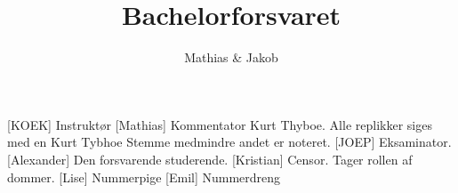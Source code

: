 \documentclass[a4paper,11pt]{article}
\title{Bachelorforsvaret}
\author{Mathias \& Jakob }
\begin{document}
\maketitle

\begin{roles}
[KOEK] Instruktør
[Mathias] Kommentator Kurt Thyboe. Alle replikker siges med en Kurt Tybhoe Stemme medmindre andet er noteret.
[JOEP] Eksaminator.
[Alexander] Den forsvarende studerende.
[Kristian] Censor. Tager rollen af dommer. 
[Lise] Nummerpige
[Emil] Nummerdreng
\end{roles}

\begin{props}
\end{props}


\begin{sketch}



\end{sketch}
\end{document}
